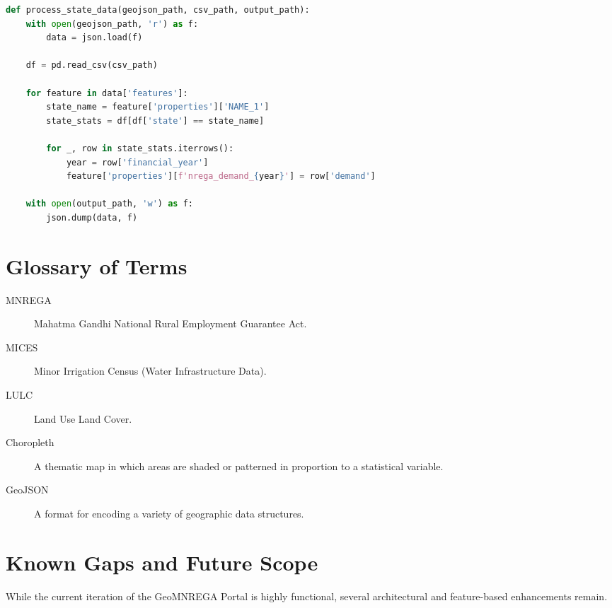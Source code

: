 \documentclass[12pt,a4paper]{report}
\begin{document}
\begin{spacing}{1.5}
\begin{lstlisting}[language=python, caption={process\_all\_nrega.py Snippet}]
def process_state_data(geojson_path, csv_path, output_path):
    with open(geojson_path, 'r') as f:
        data = json.load(f)
    
    df = pd.read_csv(csv_path)
    
    for feature in data['features']:
        state_name = feature['properties']['NAME_1']
        state_stats = df[df['state'] == state_name]
        
        for _, row in state_stats.iterrows():
            year = row['financial_year']
            feature['properties'][f'nrega_demand_{year}'] = row['demand']
            
    with open(output_path, 'w') as f:
        json.dump(data, f)
\end{lstlisting}

\chapter{Glossary of Terms}
\begin{description}
    \item[MNREGA] Mahatma Gandhi National Rural Employment Guarantee Act.
    \item[MICES] Minor Irrigation Census (Water Infrastructure Data).
    \item[LULC] Land Use Land Cover.
    \item[Choropleth] A thematic map in which areas are shaded or patterned in proportion to a statistical variable.
    \item[GeoJSON] A format for encoding a variety of geographic data structures.
\end{description}

\chapter{Known Gaps and Future Scope}

While the current iteration of the GeoMNREGA Portal is highly functional, several architectural and feature-based enhancements remain.


\end{spacing}
\end{document}
